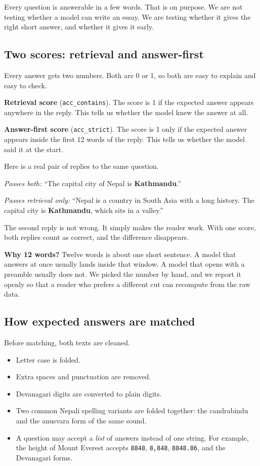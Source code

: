 \documentclass[11pt,a4paper]{article}
\begin{document}
Every question is answerable in a few words. That is on purpose. We are not testing whether a model can write an essay. We are testing whether it gives the right short answer, and whether it gives it early.

\subsection{Two scores: retrieval and answer-first}

Every answer gets two numbers. Both are 0 or 1, so both are easy to explain and easy to check.

\textbf{Retrieval score} (\texttt{acc\_contains}). The score is 1 if the expected answer appears anywhere in the reply. This tells us whether the model knew the answer at all.

\textbf{Answer-first score} (\texttt{acc\_strict}). The score is 1 only if the expected answer appears inside the first 12 words of the reply. This tells us whether the model said it at the start.

Here is a real pair of replies to the same question.

\emph{Passes both:} ``The capital city of Nepal is \textbf{Kathmandu}.''

\emph{Passes retrieval only:} ``Nepal is a country in South Asia with a long history. The capital city is \textbf{Kathmandu}, which sits in a valley.''

The second reply is not wrong. It simply makes the reader work. With one score, both replies count as correct, and the difference disappears.

\textbf{Why 12 words?} Twelve words is about one short sentence. A model that answers at once usually lands inside that window. A model that opens with a preamble usually does not. We picked the number by hand, and we report it openly so that a reader who prefers a different cut can recompute from the raw data.

\subsection{How expected answers are matched}

Before matching, both texts are cleaned.

\begin{itemize}
  \item Letter case is folded.
  \item Extra spaces and punctuation are removed.
  \item Devanagari digits are converted to plain digits.
  \item Two common Nepali spelling variants are folded together: the candrabindu and the anusvara form of the same sound.
  \item A question may accept a \emph{list} of answers instead of one string. For example, the height of Mount Everest accepts \texttt{8848}, \texttt{8,848}, \texttt{8848.86}, and the Devanagari forms.
\end{itemize}
\end{document}
